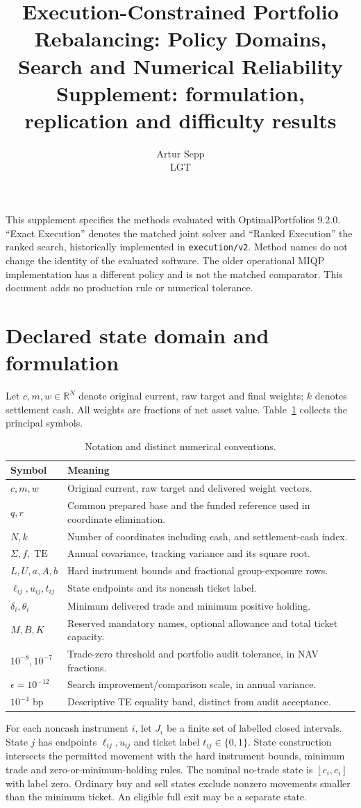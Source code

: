\documentclass[11pt]{article}
\title{Execution-Constrained Portfolio Rebalancing: Policy Domains, Search and Numerical Reliability\\Supplement: formulation, replication and difficulty results}
\author{Artur Sepp\\LGT}
\date{}
\newcommand{\R}{\mathbb{R}}
\newcommand{\TE}{\operatorname{TE}}
\begin{document}
\maketitle

This supplement specifies the methods evaluated with OptimalPortfolios 9.2.0.
``Exact Execution'' denotes the matched joint solver and ``Ranked Execution''
the ranked search, historically implemented in \texttt{execution/v2}.
Method names do not change the identity of the evaluated software. The older
operational MIQP implementation has a different policy and is not the matched
comparator. This document adds no production rule or numerical tolerance.

\section{Declared state domain and formulation}
Let $c,m,w\in\R^N$ denote original current, raw target and final weights;
$k$ denotes settlement cash. All weights are fractions of net asset value.
Table~\ref{tab:notation} collects the principal symbols.
\begin{table}[htbp]\centering\small
\caption{Notation and distinct numerical conventions.}\label{tab:notation}
\begin{tabularx}{\linewidth}{lX}\toprule
Symbol & Meaning\\\midrule
$c,m,w$ & Original current, raw target and delivered weight vectors.\\
$q,r$ & Common prepared base and the funded reference used in coordinate elimination.\\
$N,k$ & Number of coordinates including cash, and settlement-cash index.\\
$\Sigma,f,\TE$ & Annual covariance, tracking variance and its square root.\\
$L,U,a,A,b$ & Hard instrument bounds and fractional group-exposure rows.\\
$\ell_{ij},u_{ij},t_{ij}$ & State endpoints and its noncash ticket label.\\
$\delta_i,\theta_i$ & Minimum delivered trade and minimum positive holding.\\
$M,B,K$ & Reserved mandatory names, optional allowance and total ticket capacity.\\
$10^{-8},10^{-7}$ & Trade-zero threshold and portfolio audit tolerance, in NAV fractions.\\
$\epsilon=10^{-12}$ & Search improvement/comparison scale, in annual variance.\\
$10^{-4}$ bp & Descriptive TE equality band, distinct from audit acceptance.\\
\bottomrule\end{tabularx}\end{table}
For each noncash instrument $i$, let $J_i$ be a finite set of labelled closed
intervals. State $j$ has endpoints $\ell_{ij},u_{ij}$ and ticket label
$t_{ij}\in\{0,1\}$. State construction intersects the permitted movement with
the hard instrument bounds, minimum trade and zero-or-minimum-holding rules.
The nominal no-trade state is $[c_i,c_i]$ with label zero. Ordinary buy and
sell states exclude nonzero movements smaller than the minimum ticket.
An eligible full exit may be a separate state.
\end{document}
